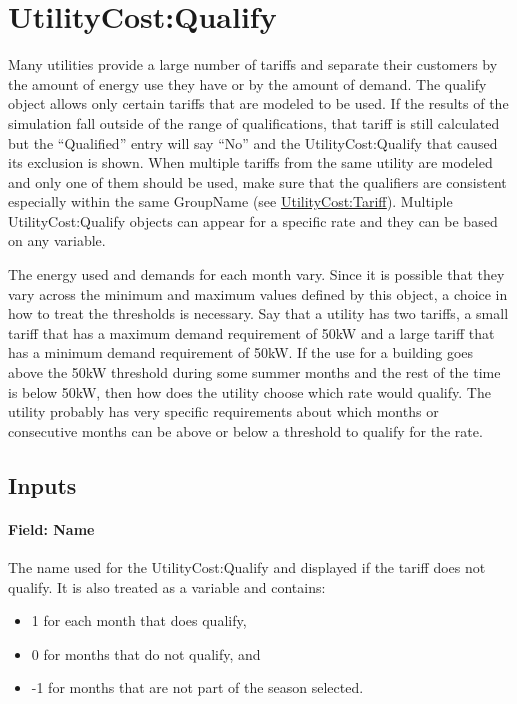 \section{UtilityCost:Qualify}\label{utilitycostqualify}

Many utilities provide a large number of tariffs and separate their customers by the amount of energy use they have or by the amount of demand. The qualify object allows only certain tariffs that are modeled to be used. If the results of the simulation fall outside of the range of qualifications, that tariff is still calculated but the ``Qualified'' entry will say ``No'' and the UtilityCost:Qualify that caused its exclusion is shown. When multiple tariffs from the same utility are modeled and only one of them should be used, make sure that the qualifiers are consistent especially within the same GroupName (see \hyperref[utilitycosttariff]{UtilityCost:Tariff}). Multiple UtilityCost:Qualify objects can appear for a specific rate and they can be based on any variable.

The energy used and demands for each month vary. Since it is possible that they vary across the minimum and maximum values defined by this object, a choice in how to treat the thresholds is necessary. Say that a utility has two tariffs, a small tariff that has a maximum demand requirement of 50kW and a large tariff that has a minimum demand requirement of 50kW. If the use for a building goes above the 50kW threshold during some summer months and the rest of the time is below 50kW, then how does the utility choose which rate would qualify. The utility probably has very specific requirements about which months or consecutive months can be above or below a threshold to qualify for the rate.

\subsection{Inputs}\label{inputs-070}

\paragraph{Field: Name}\label{field-name-063}

The name used for the UtilityCost:Qualify and displayed if the tariff does not qualify. It is also treated as a variable and contains:

\begin{itemize}
\item
  1 for each month that does qualify,
\item
  0 for months that do not qualify, and
\item
  -1 for months that are not part of the season selected.
\end{itemize}

